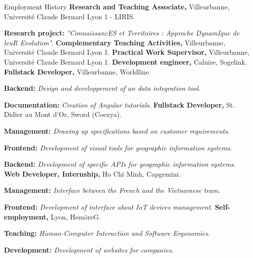 \begin{rubric}{Employment History}
%
	\textbf{Research and Teaching Associate,} Villeurbanne, Université Claude Bernard Lyon 1 - LIRIS.
	\par \textbf{Research project:} \emph{"ConnaissancES et Territoires : Approche DynamIque de leuR Evolution"}.
%
	\textbf{Complementary Teaching Activities,} Villeurbanne, Université Claude Bernard Lyon 1.
%
	\textbf{Practical Work Supervisor,} Villeurbanne, Université Claude Bernard Lyon 1.
%
	\textbf{Development engineer,} Caluire, Sogelink.
%
	\textbf{Fullstack Developer,}  Villeurbanne, Worldline.
    \par \textbf{Backend:} \emph{Design and developpement of an data integration tool}.
    \par \textbf{Documentation:} \emph{Creation of Angular tutorials}.
%
	\textbf{Fullstack Developer,} St. Didier au Mont d'Or, Sword (Coexya).
    \par \textbf{Management:} \emph{Drawing up specifications based on customer requirements}.
    \par \textbf{Frontend:} \emph{Development of visual tools for geographic information systems}.
    \par \textbf{Backend:} \emph{Development of specific APIs for geographic information systems}.
%
	\textbf{Web Developer, Internship,} Ho Chi Minh, Capgemini.
    \par \textbf{Management:} \emph{Interface between the French and the Vietnamese team}.
    \par \textbf{Frontend:} \emph{Development of interface about IoT devices management}.
%
	\textbf{Self-employment,} Lyon, HemöreG.
    \par \textbf{Teaching:} \emph{Human-Computer Interaction and Software Ergonomics}.
    \par \textbf{Development:} \emph{Development of websites for companies}.
\end{rubric}